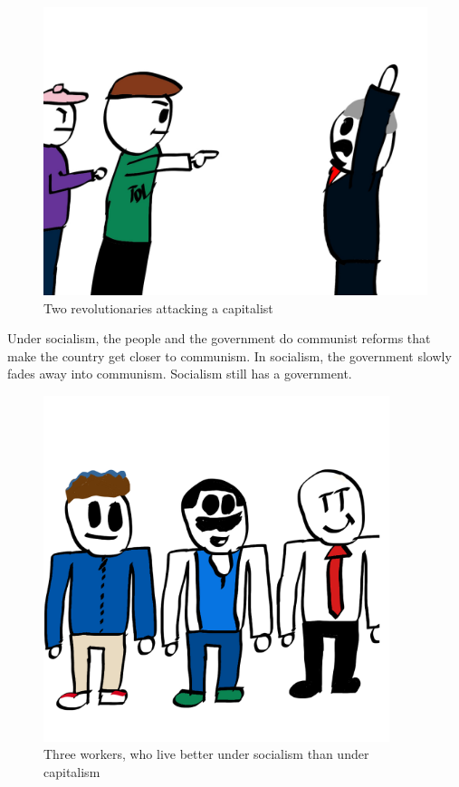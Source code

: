 \documentclass[a4paper]{book} %
\begin{document}
\begin{figure}[tbhp]
\centering
\includegraphics[height=0.3\textheight]{3-1.png}
\caption{Two revolutionaries attacking a capitalist}
\end{figure}

\newpage

Under socialism, the people and the government do communist reforms that make the country get closer to communism. In socialism, the government slowly fades away into communism. Socialism still has a government.

\begin{figure}[tbhp]
\centering
\includegraphics[width=0.9\textwidth]{3-2.png}
\caption{Three workers, who live better under socialism than under capitalism}
\end{figure}
\end{document}
